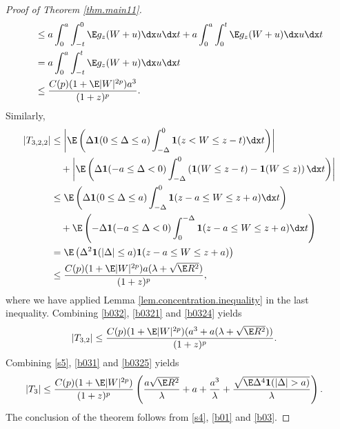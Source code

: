 \begin{proof}[Proof of Theorem \ref{thm.main11}]
\begin{equation}
\begin{aligned}
			&\le  a\int_{0}^{a}\int_{-t}^{0}\E g_{z}(W+u)\dx u \dx t  + a\int_{0}^{a}\int_{0}^{t}\E g_{z}(W+u)\dx u \dx t \\
			&= 	a \int_{0}^{a}\int_{-t}^{t}\E g_{z}(W+u)\dx u \dx t\\
			& \le  \dfrac{C(p)(1+\E|W|^{2p})a^3}{(1+z)^p}.
		\end{aligned} 
	\end{equation}		
	Similarly,
	\begin{equation} \label{b0324}
		\begin{aligned}
			|T_{3,2,2}|&\le\left|\E\left( \Delta \mathbf{1}(0\le \Delta\le a)\int_{-\Delta}^{0}\mathbf{1}(z< W \le z-t)\dx t\right)\right|\\
			&\quad+\left|\E\left( \Delta \mathbf{1}(-a\le \Delta<0)\int_{-\Delta}^{0}\left(\mathbf{1}(W \le z-t) - \mathbf{1}(W \le z)\right)\dx t \right)\right|\\
			&\le \E\left( \Delta \mathbf{1}(0\le \Delta\le a)\int_{-\Delta}^{0}\mathbf{1}(z-a\le  W \le z+a)\dx t\right) \\
			&\quad+\E\left(-\Delta \mathbf{1}(-a\le \Delta<0)\int_{0}^{-\Delta}\mathbf{1}(z-a\le  W \le z+a)\dx t \right)\\
			&= \E\left( \Delta^2 \mathbf{1}(|\Delta|\le a)\mathbf{1}(z-a\le  W \le z+a)\right)\\
			&\le \frac{C(p)(1+\E|W|^{2p})a(\lambda+\sqrt{\E R^{2}})}{(1+z)^p},
		\end{aligned} 
	\end{equation}
	where we have applied Lemma \ref{lem.concentration.inequality} in the last inequality.
	Combining \eqref{b032}, \eqref{b0321} and \eqref{b0324} yields
	\begin{equation} \label{b0325}
		\begin{aligned}
			|T_{3,2}|&\le \frac{C(p)(1+\E|W|^{2p})(a^3+a(\lambda+\sqrt{\E R^{2}}))}{(1+z)^p}.
		\end{aligned} 
	\end{equation}
	Combining \eqref{s5}, \eqref{b031} and \eqref{b0325} yields
	\begin{align} \label{b03}
		\begin{aligned}
			|T_{3}| &\le \dfrac{C(p)(1+\E|W|^{2p})}{(1+z)^p}\left(\dfrac{a \sqrt{\E R^2}}{\lambda}+ a + \dfrac{ a^3}{\lambda}+\dfrac{\sqrt{\E\Delta^4 \mathbf{1}(|\Delta|>a)}}{\lambda}\right). 
		\end{aligned} 
	\end{align}
	The conclusion of the theorem follows from \eqref{s4}, \eqref{b01} and \eqref{b03}.
	
\end{proof}

